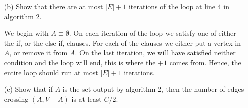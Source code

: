 \documentclass[11pt]{article}
\begin{document}
\begin{itemize}
\item[(b)] Show that there are at most $|E|+1$ iterations of the loop at
    line 4 in algorithm 2.
    
    We begin with $A\equiv \emptyset$. On each iteration of the loop we satisfy 
    one of either the if, or the else if, clauses. For each of the clauses we
    either put a vertex in $A$, or remove it from $A$. 
    On the last iteration, we will have satisfied neither condition and 
    the loop will end, this is where the $+1$ comes from. Hence, the entire 
    loop should run at most $|E|+1$ iterations. 
    
  \item[(c)] Show that if $A$ is the set output by algorithm 2, then the number 
    of edges crossing $(A,V-A)$ is at least $C/2$.
    
    
    
\end{itemize}
\end{document}
